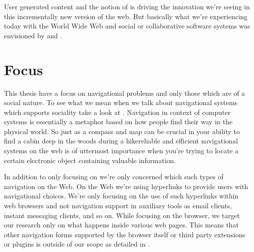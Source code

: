 User generated content and the notion of  is
driving the innovation we're seeing in this incrementally new version of the
web. But basically what we're experiencing today with the World Wide Web
and social or collaborative software systems was envisioned by \citet{bush45}
and \citet{licklider68}.

\section{Focus}

This thesis have a focus on navigational problems and only those
which are of a social nature. To see what we mean when we talk about
navigational systems which supports sociality take a look at
.
Navigation in context of computer systems is
essentially a metaphor based on how people find their way in the physical
world. So just as a compass and map can be crucial in your ability to find a
cabin deep in the woods during a hike\dash{}reliable and efficient
navigational systems on the web is of uttermost importance when you're trying
to locate a certain electronic object containing valuable information.


In addition to only focusing on  we're only concerned
which such types of navigation on the Web.
On the Web we're using hyperlinks \citep[p.~90]{nelson65} to provide users
with navigational choices. We're only focusing on the use of such hyperlinks
within web browsers and not navigation support in auxiliary tools as email
clients, instant messaging clients, and so on. While focusing on the browser,
we target our research only on what happens inside various web pages. This
means that other navigation forms supported by the browser itself or third
party extensions or plugins is outside of our scope as detailed in
.

